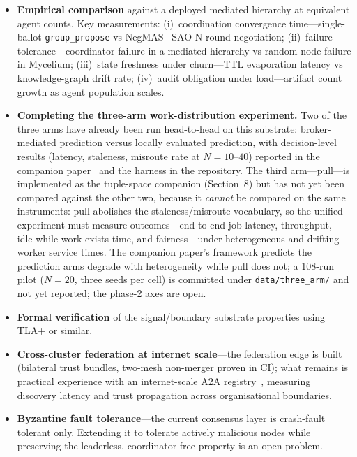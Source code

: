\documentclass[11pt]{article}
\begin{document}
\begin{itemize}
\item \textbf{Empirical comparison} against a deployed mediated hierarchy at
  equivalent agent counts. Key measurements: (i)~coordination convergence
  time---single-ballot \texttt{group\_propose} vs NegMAS~\cite{negmas} SAO
  N-round negotiation; (ii)~failure tolerance---coordinator failure in a mediated
  hierarchy vs random node failure in Mycelium; (iii)~state freshness under
  churn---TTL evaporation latency vs knowledge-graph drift rate; (iv)~audit
  obligation under load---artifact count growth as agent population scales.

\item \textbf{Completing the three-arm work-distribution experiment.} Two of
  the three arms have already been run head-to-head on this substrate:
  broker-mediated prediction versus locally evaluated prediction, with
  decision-level results (latency, staleness, misroute rate at
  $N=10$--$40$) reported in the companion paper~\cite{companion} and the harness in the
  repository. The third arm---pull---is implemented as the tuple-space
  companion (Section~8) but has not yet been compared against the other two,
  because it \emph{cannot} be compared on the same instruments: pull abolishes
  the staleness/misroute vocabulary, so the unified experiment must measure
  outcomes---end-to-end job latency, throughput, idle-while-work-exists time,
  and fairness---under heterogeneous and drifting worker service times. The
  companion paper's framework predicts the prediction arms degrade with
  heterogeneity while pull does not; a 108-run pilot ($N=20$, three seeds per
  cell) is committed under \texttt{data/three\_arm/} and not yet reported; the
  phase-2 axes are open.

\item \textbf{Formal verification} of the signal/boundary substrate properties
  using TLA+ or similar.

\item \textbf{Cross-cluster federation at internet scale}---the federation edge is
  built (bilateral trust bundles, two-mesh non-merger proven in CI); what remains is
  practical experience with an internet-scale A2A registry~\cite{nanda}, measuring
  discovery latency and trust propagation across organisational boundaries.

\item \textbf{Byzantine fault tolerance}---the current consensus layer is
  crash-fault tolerant only. Extending it to tolerate actively malicious nodes
  while preserving the leaderless, coordinator-free property is an open problem.


\end{itemize}
\end{document}
